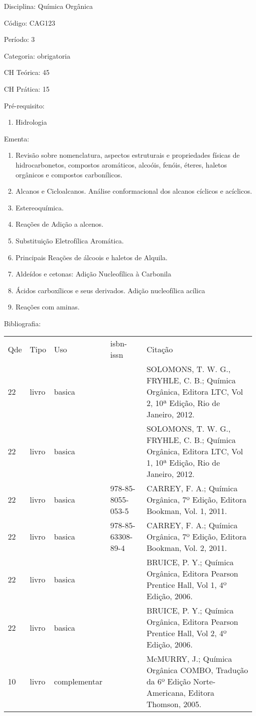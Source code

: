 \documentclass[12pt,a4paper,twoside]{report}
\begin{document}
Disciplina: Química Orgânica

Código: CAG123

Período: 3

Categoria: obrigatoria

CH Teórica: 45

CH Prática: 15




Pré-requisito:
\begin{enumerate}
\item Hidrologia
\end{enumerate}

Ementa:
\begin{enumerate}
\item Revisão sobre nomenclatura, aspectos estruturais e propriedades físicas de hidrocarbonetos, compostos aromáticos, alcoóis, fenóis, éteres, haletos orgânicos e compostos carbonílicos.
\item Alcanos e Cicloalcanos. Análise conformacional dos alcanos cíclicos e acíclicos.
\item Estereoquímica.
\item Reações de Adição a alcenos.
\item Substituição Eletrofílica Aromática.
\item Principais Reações de álcoois e haletos de Alquila.
\item Aldeídos e cetonas: Adição Nucleofílica à Carbonila
\item Ácidos carboxílicos e seus derivados. Adição nucleofílica acílica
\item Reações com aminas.
\end{enumerate}



Bibliografia:


\begin{tabular}{llllp{8cm}}
Qde & Tipo & Uso & isbn-issn & Citação \\
22&livro&basica&&SOLOMONS, T. W. G., FRYHLE, C. B.; Química Orgânica, Editora LTC, Vol 2, 10ª Edição, Rio de Janeiro, 2012.\\
22&livro&basica&&SOLOMONS, T. W. G., FRYHLE, C. B.; Química Orgânica, Editora LTC, Vol 1, 10ª Edição, Rio de Janeiro, 2012.\\
22&livro&basica&978-85-8055-053-5&CARREY, F. A.; Química Orgânica, 7º Edição, Editora Bookman, Vol. 1, 2011.\\
22&livro&basica&978-85-63308-89-4&CARREY, F. A.; Química Orgânica, 7º Edição, Editora Bookman, Vol. 2, 2011.\\
22&livro&basica&&BRUICE, P. Y.; Química Orgânica, Editora Pearson Prentice Hall, Vol 1, 4º Edição, 2006.\\
22&livro&basica&&BRUICE, P. Y.; Química Orgânica, Editora Pearson Prentice Hall, Vol 2, 4º Edição, 2006.\\
10&livro&complementar&&McMURRY, J.; Química Orgânica COMBO, Tradução da 6º Edição Norte-Americana, Editora Thomson, 2005.\\
\end{tabular}
\end{document}
